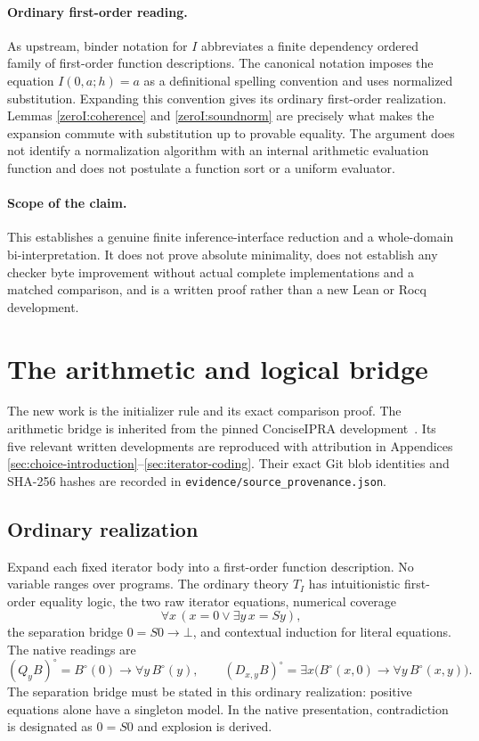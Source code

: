\documentclass[11pt,a4paper]{article}
\theoremstyle{definition}
\begin{document}
\paragraph{Ordinary first-order reading.}
As upstream, binder notation for $I$ abbreviates a finite dependency
ordered family of first-order function descriptions.  The canonical
notation imposes the equation $I(0,a;h)=a$ as a definitional spelling
convention and uses normalized substitution.  Expanding this convention
gives its ordinary first-order realization.  Lemmas
\ref{zeroI:coherence} and \ref{zeroI:soundnorm} are precisely what makes
the expansion commute with substitution up to provable equality.
The argument does not identify a normalization algorithm with an
internal arithmetic evaluation function and does not postulate a
function sort or a uniform evaluator.

\paragraph{Scope of the claim.}
This establishes a genuine finite inference-interface reduction and a
whole-domain bi-interpretation.  It does not prove absolute minimality,
does not establish any checker byte improvement without actual complete
implementations and a matched comparison, and is a written proof rather
than a new Lean or Rocq development.


\section{The arithmetic and logical bridge}
\label{sec:bridge-summary}

The new work is the initializer rule and its exact comparison proof.
The arithmetic bridge is inherited from the pinned ConciseIPRA
development~\cite{upstream}. Its five relevant written developments
are reproduced with attribution in Appendices
\ref{sec:choice-introduction}--\ref{sec:iterator-coding}.
Their exact Git blob identities and SHA-256 hashes are recorded in
\texttt{evidence/source\_provenance.json}.

\subsection{Ordinary realization}

Expand each fixed iterator body into a first-order function description.
No variable ranges over programs. The ordinary theory \(T_I\) has
intuitionistic first-order equality logic, the two raw iterator equations,
numerical coverage
\[
 \forall x\,(x=0\vee\exists y\,x=Sy),
\]
the separation bridge \(0=S0\to\bot\), and contextual induction for
literal equations. The native readings are
\[
 (Q_yB)^\circ=B^\circ(0)\to\forall y\,B^\circ(y),\qquad
 (D_{x,y}B)^\circ=
 \exists x\bigl(B^\circ(x,0)\to\forall y\,B^\circ(x,y)\bigr).
\]
The separation bridge must be stated in this ordinary realization:
positive equations alone have a singleton model. In the native
presentation, contradiction is designated as \(0=S0\) and explosion
is derived.
\end{document}
